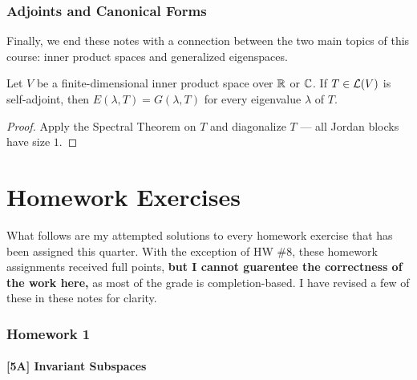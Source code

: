 \documentclass{article}
\begin{document}
\section{Adjoints and Canonical Forms}
Finally, we end these notes with a connection between the two main topics of this course: inner product spaces and generalized eigenspaces.
\begin{theorem}
Let $V$ be a finite-dimensional inner product space over $\mathbb R$ or $\mathbb C$. If $T\in\mathcal L(V)$ is self-adjoint, then $E(\lambda, T) = G(\lambda, T)$ for every eigenvalue $\lambda$ of $T$.
\end{theorem}
\begin{proof}
Apply the Spectral Theorem on $T$ and diagonalize $T$ --- all Jordan blocks have size $1$.
\end{proof}
\newpage
\part*{Homework Exercises}
What follows are my attempted solutions to every homework exercise that has been assigned this quarter. With the exception of HW \#8, these homework assignments received full points, \textbf{but I cannot guarentee the correctness of the work here,} as most of the grade is completion-based. I have revised a few of these in these notes for clarity.
\section*{Homework 1}
\subsection*{[5A] Invariant Subspaces}
\end{document}
